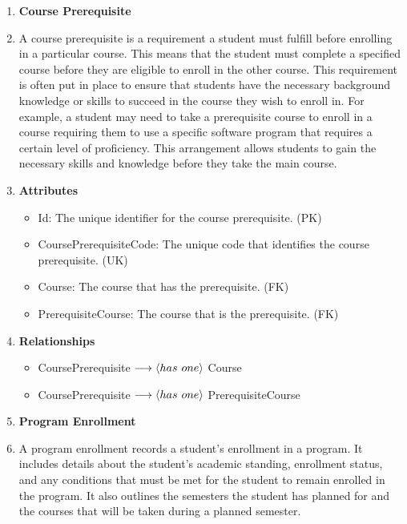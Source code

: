 \documentclass[12pt]{article}
\begin{document}
\begin{appendices}
\begin{enumerate}[label=(\roman*)]
    \item \textbf{Course Prerequisite}
    \item[] A course prerequisite is a requirement a student must fulfill before enrolling in a particular course. This means that the student must complete a specified course before they are eligible to enroll in the other course. This requirement is often put in place to ensure that students have the necessary background knowledge or skills to succeed in the course they wish to enroll in. For example, a student may need to take a prerequisite course to enroll in a course requiring them to use a specific software program that requires a certain level of proficiency. This arrangement allows students to gain the necessary skills and knowledge before they take the main course.
    \item[] \textbf{Attributes}
    \begin{itemize}
        \item Id: The unique identifier for the course prerequisite. (PK)
        \item CoursePrerequisiteCode: The unique code that identifies the course prerequisite. (UK)
        \item Course: The course that has the prerequisite. (FK)
        \item PrerequisiteCourse: The course that is the prerequisite. (FK)
    \end{itemize}
    \item[] \textbf{Relationships}
    \begin{itemize}
        \item CoursePrerequisite $ \longrightarrow \langle has \hspace{0.125cm} one \rangle $ Course
        \item CoursePrerequisite $ \longrightarrow \langle has \hspace{0.125cm} one \rangle $ PrerequisiteCourse
    \end{itemize}

    \item \textbf{Program Enrollment}
    \item[] A program enrollment records a student's enrollment in a program. It includes details about the student's academic standing, enrollment status, and any conditions that must be met for the student to remain enrolled in the program. It also outlines the semesters the student has planned for and the courses that will be taken during a planned semester. 


\end{enumerate}
\end{appendices}
\end{document}
